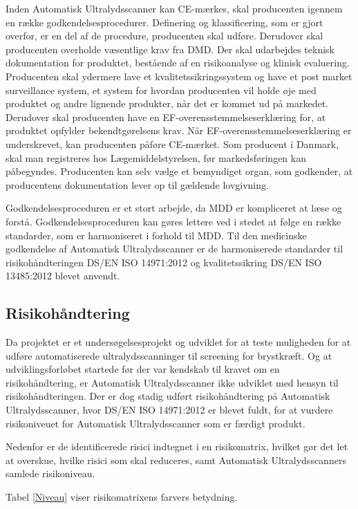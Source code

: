 Inden Automatisk Ultralydsscanner kan CE-mærkes, skal producenten igennem en række godkendelsesprocedurer. Definering og klassificering, som er gjort overfor, er en del af de procedure, producenten skal udføre. Derudover skal producenten overholde væsentlige krav fra DMD. Der skal udarbejdes teknisk dokumentation for produktet, bestående af en risikoanalyse og klinisk evaluering. Producenten skal ydermere lave et kvalitetssikringssystem og have et post market surveillance system, et system for hvordan producenten vil holde øje med produktet og andre lignende produkter, når det er kommet ud på markedet. Derudover skal producenten have en EF-overensstemmelseserklæring for, at produktet opfylder bekendtgørelsens krav. Når EF-overensstemmelseserklæring er underskrevet, kan producenten påføre CE-mærket. Som producent i Danmark, skal man registreres hos Lægemiddelstyrelsen, før markedsføringen kan påbegyndes. Producenten kan selv vælge et bemyndiget organ, som godkender, at producentens dokumentation lever op til gældende lovgivning. \cite{Klasse} 

Godkendelsesproceduren er et stort arbejde, da MDD er kompliceret at læse og forstå. Godkendelsesproceduren kan gøres lettere ved i stedet at følge en række standarder, som er harmoniseret i forhold til MDD. Til den medicinske godkendelse af Automatisk Ultralydsscanner er de harmoniserede standarder til risikohåndteringen DS/EN ISO 14971:2012 \cite{14971} og kvalitetssikring DS/EN ISO 13485:2012 \cite{13485} blevet anvendt. 

\subsection{Risikohåndtering}
Da projektet er et undersøgelsesprojekt og udviklet for at teste muligheden for at udføre automatiserede ultralydsscanninger til screening for brystkræft. Og at udviklingsforløbet startede før der var kendskab til kravet om en risikohåndtering, er Automatisk Ultralydsscanner ikke udviklet med hensyn til risikohåndteringen. Der er dog stadig udført risikohåndtering på Automatisk Ultralydsscanner, hvor DS/EN ISO 14971:2012 er blevet fuldt, for at vurdere risikoniveuet for Automatisk Ultralydsscanner som er færdigt produkt. 

Nedenfor er de identificerede risici indtegnet i en risikomatrix, hvilket gør det let at overskue, hvilke risici som skal reduceres, samt Automatisk Ultralydsscanners samlede risikoniveau.  

Tabel \ref{Niveau} viser risikomatrixens farvers betydning. 

